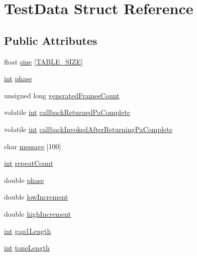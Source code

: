 \hypertarget{struct_test_data}{}\section{Test\+Data Struct Reference}
\label{struct_test_data}
\subsection*{Public Attributes}
\begin{DoxyCompactItemize}
\item 
float \hyperlink{struct_test_data_a13af6d37ddd977277e3a151432f6ac8d}{sine} \mbox{[}\hyperlink{sine_8cxx_ada4ebb227211f96616c9e6681a944bc1}{T\+A\+B\+L\+E\+\_\+\+S\+I\+ZE}\mbox{]}
\item 
\hyperlink{xmltok_8h_a5a0d4a5641ce434f1d23533f2b2e6653}{int} \hyperlink{struct_test_data_a676e23524d19ee0d0ab418ca2711f3fc}{phase}
\item 
unsigned long \hyperlink{struct_test_data_a0cba315e16166503eba8d3906254de95}{generated\+Frames\+Count}
\item 
volatile \hyperlink{xmltok_8h_a5a0d4a5641ce434f1d23533f2b2e6653}{int} \hyperlink{struct_test_data_a2fe061a08b53bcfe897fb3bfe2ccbd23}{callback\+Returned\+Pa\+Complete}
\item 
volatile \hyperlink{xmltok_8h_a5a0d4a5641ce434f1d23533f2b2e6653}{int} \hyperlink{struct_test_data_aeb6d0c0601a66a26b41e97f00ee6edbb}{callback\+Invoked\+After\+Returning\+Pa\+Complete}
\item 
char \hyperlink{struct_test_data_ab086bd8efe2e156d3bf6d2edcd20acfd}{message} \mbox{[}100\mbox{]}
\item 
\hyperlink{xmltok_8h_a5a0d4a5641ce434f1d23533f2b2e6653}{int} \hyperlink{struct_test_data_a635ef4394012dfaf9516c59488ea874d}{repeat\+Count}
\item 
double \hyperlink{struct_test_data_a8cd80e61ff8b13b9824abc6560a36e73}{phase}
\item 
double \hyperlink{struct_test_data_ac60eaf6fc24ef246b450e292c4d54019}{low\+Increment}
\item 
double \hyperlink{struct_test_data_af315225298caa18b1a18cda784a6a4a3}{high\+Increment}
\item 
\hyperlink{xmltok_8h_a5a0d4a5641ce434f1d23533f2b2e6653}{int} \hyperlink{struct_test_data_a4d33af02923caafa07771286273191e8}{gap1\+Length}
\item 
\hyperlink{xmltok_8h_a5a0d4a5641ce434f1d23533f2b2e6653}{int} \hyperlink{struct_test_data_ab9ed9120bca939e812886794baf23db5}{tone\+Length}

\end{DoxyCompactItemize}
